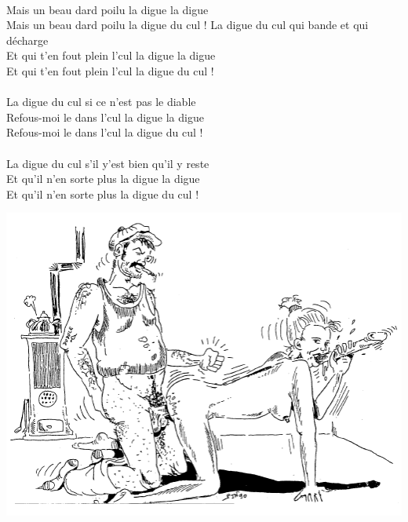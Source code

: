 \\Mais un beau dard poilu la digue la digue
\\Mais un beau dard poilu la digue du cul !
\breakpage
La digue du cul qui bande et qui décharge  ~\bissimple
\\Et qui t'en fout plein l'cul la digue la digue
\\Et qui t'en fout plein l'cul la digue du cul !
\\\\La digue du cul si ce n'est pas le diable  ~~\bissimple
\\Refous-moi le dans l'cul la digue la digue
\\Refous-moi le dans l'cul la digue du cul !
\\\\La digue du cul s'il y'est bien qu'il y reste ~\bissimple
\\Et qu'il n'en sorte plus la digue la digue
\\Et qu'il n'en sorte plus la digue du cul !
\bigskip
\bigskip
\bigskip
\begin{center}
\includegraphics[width=1\textwidth]{images/image4.PNG}
\end{center}

\breakpage